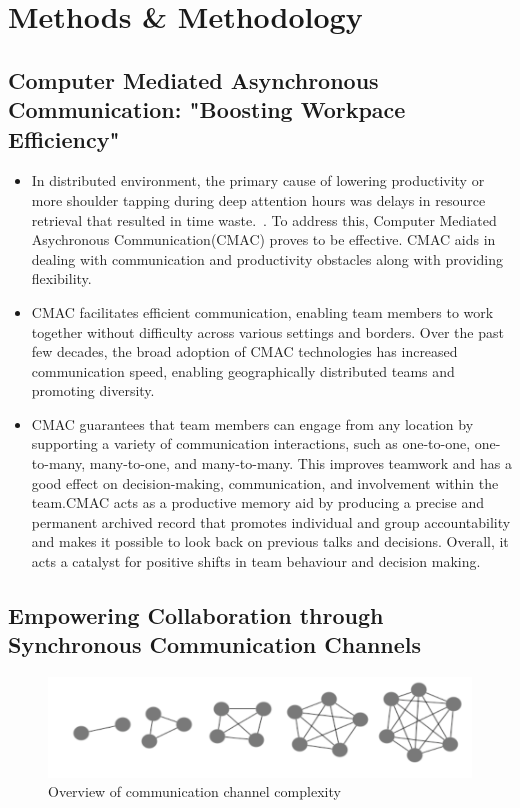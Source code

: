 \documentclass{llncs}
\begin{document}
\section{Methods \& Methodology}
\subsection{Computer Mediated Asynchronous Communication: "Boosting Workpace Efficiency"}

\begin{itemize}
    \item In distributed environment, the primary cause of lowering productivity or more shoulder tapping during deep attention hours was delays in resource retrieval that resulted in time waste.~\cite{refbook1}. To address this, Computer Mediated Asychronous Communication(CMAC) proves to be effective. CMAC aids in dealing with communication and productivity obstacles along with providing flexibility.~\cite{refpaper6}\\
    \item CMAC facilitates efficient communication, enabling team members to work together without difficulty across various settings and borders. Over the past few decades, the broad adoption of CMAC technologies has increased communication speed, enabling geographically distributed teams and promoting diversity.~\cite{refpaper6}\\
    \item CMAC guarantees that team members can engage from any location by supporting a variety of communication interactions, such as one-to-one, one-to-many, many-to-one, and many-to-many. This improves teamwork and has a good effect on decision-making, communication, and involvement within the team.CMAC acts as a productive memory aid by producing a precise and permanent archived record that promotes individual and group accountability and makes it possible to look back on previous talks and decisions. Overall, it acts a catalyst for positive shifts in team behaviour and decision making.~\cite{refpaper6}
\end{itemize}

\subsection{Empowering Collaboration through Synchronous Communication Channels}

\begin{figure}
    \centering
    \includegraphics[width=0.9\linewidth]{CommunicationComplexity.png}
    \caption{Overview of communication channel complexity}
    \label{fig:communication-complexity}
\end{figure}
\end{document}
